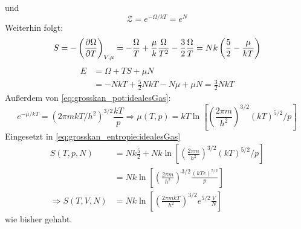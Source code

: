 und
\begin{equation}
    \mathcal{Z} = e^{- \Omega / k T} = e^N
\end{equation}
Weiterhin folgt:
\begin{equation}
    \label{eq:grosskan_entropie:idealesGas}
    S = - \left( \frac{\partial \Omega}{\partial T} \right)_{V, \mu} = - \frac{\Omega}{T} + \frac{\mu}{k} \frac{\Omega}{T^2} - \frac{3}{2} \frac{\Omega}{T} = Nk \left( \frac{5}{2} - \frac{\mu}{k T} \right)
\end{equation}
\begin{equation}
    \begin{split}
        E & = \Omega + TS + \mu N \\
        & = - N k T + \frac{5}{2} N k T - N \mu + \mu N = \frac{3}{2} N k T
    \end{split}
\end{equation}
Außerdem von \autoref{eq:grosskan_pot:idealesGas}:
\begin{equation}
    e^{-\mu / k T} = \left( 2 \pi m k T / h^2 \right)^{3/2} \frac{k T}{p} \Rightarrow \mu(T, p) = k T \ln \left[ \left( \frac{2 \pi m}{h^2} \right)^{3/2} \left( k T \right)^{5/2} / p \right]
\end{equation}
Eingesetzt in \autoref{eq:grosskan_entropie:idealesGas}
\begin{equation}
    \begin{split}
        S(T, p, N) &= N k \frac{5}{2} + N k \ln \left[ \left( \frac{2 \pi m}{h^2} \right)^{3/2} \left( k T \right)^{5/2} / p \right] \\
        &= N k \ln \left[ \left( \frac{2 \pi m}{h^2} \right)^{3/2} \frac{ \left( k T e \right)^{5/2}}{p} \right] \\
        \Rightarrow S(T, V, N) &= N k \ln \left[ \left( \frac{2 \pi m k T}{h^2} \right)^{3/2} e^{5/2} \frac{V}{N} \right]
    \end{split}
\end{equation}
wie bisher gehabt.

